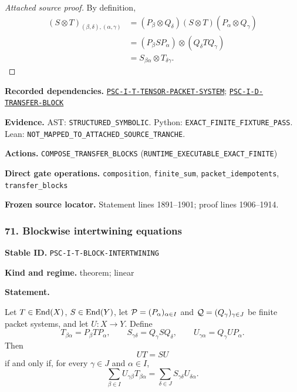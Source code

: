 \documentclass[a4paper,11pt]{article}
\newcommand{\field}[2]{\noindent\textbf{#1.} #2\par}
\begin{document}
\begin{proof}[Attached source proof]
By definition,
\begin{align*}
(S\otimes T)_{(\beta,\delta),(\alpha,\gamma)}
&=(P_\beta\otimes Q_\delta)(S\otimes T)(P_\alpha\otimes Q_\gamma)\\
&=(P_\beta SP_\alpha)\otimes(Q_\delta TQ_\gamma)\\
&=S_{\beta\alpha}\otimes T_{\delta\gamma}.
\end{align*}
\end{proof}
\field{Recorded dependencies}{\hyperref[rec:PSC-I-T-TENSOR-PACKET-SYSTEM]{\nolinkurl{PSC-I-T-TENSOR-PACKET-SYSTEM}}; \hyperref[rec:PSC-I-D-TRANSFER-BLOCK]{\nolinkurl{PSC-I-D-TRANSFER-BLOCK}}}
\field{Evidence}{AST: \nolinkurl{STRUCTURED_SYMBOLIC}. Python: \nolinkurl{EXACT_FINITE_FIXTURE_PASS}. Lean: \nolinkurl{NOT_MAPPED_TO_ATTACHED_SOURCE_TRANCHE}.}
\field{Actions}{\nolinkurl{COMPOSE_TRANSFER_BLOCKS} (\nolinkurl{RUNTIME_EXECUTABLE_EXACT_FINITE})}
\field{Direct gate operations}{\nolinkurl{composition}, \nolinkurl{finite_sum}, \nolinkurl{packet_idempotents}, \nolinkurl{transfer_blocks}}
\field{Frozen source locator}{Statement lines 1891--1901; proof lines 1906--1914.}
\subsubsection*{71. Blockwise intertwining equations}
\label{rec:PSC-I-T-BLOCK-INTERTWINING}
\field{Stable ID}{\nolinkurl{PSC-I-T-BLOCK-INTERTWINING}}
\field{Kind and regime}{theorem; linear}
\textbf{Statement.}\par
Let \(T\in\operatorname{End}(X)\), \(S\in\operatorname{End}(Y)\), let \(\mathcal P=(P_\alpha)_{\alpha\in I}\) and \(\mathcal Q=(Q_\gamma)_{\gamma\in J}\) be finite packet systems, and let \(U:X\to Y\).  Define
\[
T_{\beta\alpha}=P_\beta TP_\alpha,
\qquad
S_{\gamma\delta}=Q_\gamma SQ_\delta,
\qquad
U_{\gamma\alpha}=Q_\gamma UP_\alpha.
\]
Then
\[
\boxed{UT=SU}
\]
if and only if, for every \(\gamma\in J\) and \(\alpha\in I\),
\[
\boxed{
\sum_{\beta\in I}U_{\gamma\beta}T_{\beta\alpha}
=
\sum_{\delta\in J}S_{\gamma\delta}U_{\delta\alpha}.
}
\]
\end{document}
